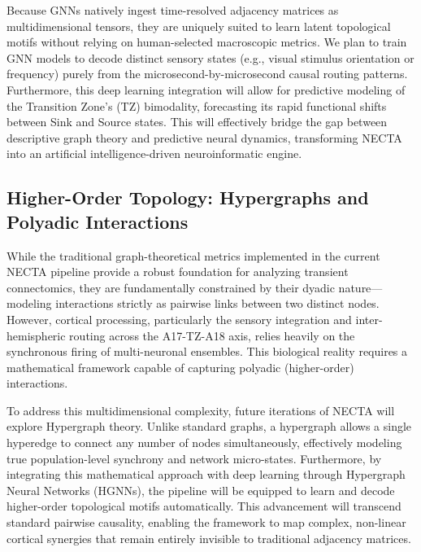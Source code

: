 Because GNNs natively ingest time-resolved adjacency matrices as multidimensional tensors, they are uniquely suited to learn latent topological motifs without relying on human-selected macroscopic metrics. We plan to train GNN models to decode distinct sensory states (e.g., visual stimulus orientation or frequency) purely from the microsecond-by-microsecond causal routing patterns. Furthermore, this deep learning integration will allow for predictive modeling of the Transition Zone's (TZ) bimodality, forecasting its rapid functional shifts between Sink and Source states. This will effectively bridge the gap between descriptive graph theory and predictive neural dynamics, transforming NECTA into an artificial intelligence-driven neuroinformatic engine.

\subsection{Higher-Order Topology: Hypergraphs and Polyadic Interactions}
While the traditional graph-theoretical metrics implemented in the current NECTA pipeline provide a robust foundation for analyzing transient connectomics, they are fundamentally constrained by their dyadic nature---modeling interactions strictly as pairwise links between two distinct nodes. However, cortical processing, particularly the sensory integration and inter-hemispheric routing across the A17-TZ-A18 axis, relies heavily on the synchronous firing of multi-neuronal ensembles. This biological reality requires a mathematical framework capable of capturing polyadic (higher-order) interactions.

To address this multidimensional complexity, future iterations of NECTA will explore Hypergraph theory. Unlike standard graphs, a hypergraph allows a single hyperedge to connect any number of nodes simultaneously, effectively modeling true population-level synchrony and network micro-states. Furthermore, by integrating this mathematical approach with deep learning through Hypergraph Neural Networks (HGNNs), the pipeline will be equipped to learn and decode higher-order topological motifs automatically. This advancement will transcend standard pairwise causality, enabling the framework to map complex, non-linear cortical synergies that remain entirely invisible to traditional adjacency matrices.